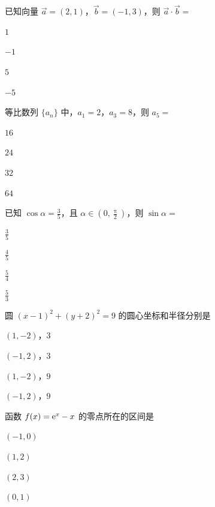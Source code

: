 \documentclass{exam-zh}
\begin{document}
\begin{question}
  已知向量 $\vec{a} = (2, 1)$，$\vec{b} = (-1, 3)$，则 $\vec{a} \cdot \vec{b} = $ \paren[A]
  \begin{choices}
    \item $1$
    \item $-1$
    \item $5$
    \item $-5$
  \end{choices}
\end{question}

\begin{question}
  等比数列 $\{a_n\}$ 中，$a_1 = 2$，$a_3 = 8$，则 $a_5 = $ \paren[C]
  \begin{choices}
    \item $16$
    \item $24$
    \item $32$
    \item $64$
  \end{choices}
\end{question}

\begin{question}
  已知 $\cos \alpha = \frac{3}{5}$，且 $\alpha \in (0, \frac{\uppi}{2})$，则 $\sin \alpha = $ \paren[B]
  \begin{choices}
    \item $\frac{3}{5}$
    \item $\frac{4}{5}$
    \item $\frac{5}{4}$
    \item $\frac{5}{3}$
  \end{choices}
\end{question}

\begin{question}
  圆 $(x - 1)^2 + (y + 2)^2 = 9$ 的圆心坐标和半径分别是\paren[A]
  \begin{choices}
    \item $(1, -2)$，$3$
    \item $(-1, 2)$，$3$
    \item $(1, -2)$，$9$
    \item $(-1, 2)$，$9$
  \end{choices}
\end{question}

\begin{question}
  函数 $f(x) = \mathrm{ e }^x - x$ 的零点所在的区间是\paren[D]
  \begin{choices}
    \item $(-1, 0)$
    \item $(1, 2)$
    \item $(2, 3)$
    \item $(0, 1)$
  \end{choices}
\end{question}
\end{document}
